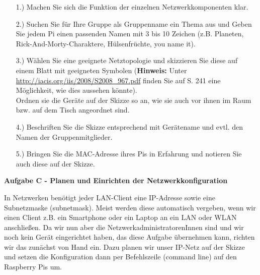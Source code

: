 \documentclass[paper=a4,fontsize=11pt]{scrartcl}%
\numberwithin{equation}{section}
\begin{document}
\begin{itemize}
	\item[1.)] Machen Sie sich die Funktion der einzelnen Netzwerkkomponenten klar.
	\item[2.)] Suchen Sie für Ihre Gruppe als Gruppenname ein Thema aus und Geben Sie jedem Pi einen passenden Namen mit 3 bis 10 Zeichen (z.B. Planeten, Rick-And-Morty-Charaktere, Hülsenfrüchte, you name it).
	\item[3.)] Wählen Sie eine geeignete Netztopologie und skizzieren Sie diese auf einem Blatt mit geeigneten Symbolen (\textbf{Hinweis:} Unter \url{http://iacis.org/iis/2008/S2008_967.pdf} finden Sie auf S. 241 eine Möglichkeit, wie dies aussehen könnte).\\
	Ordnen sie die Geräte auf der Skizze so an, wie sie auch vor ihnen im Raum bzw. auf dem Tisch angeordnet sind. 
	\item[4.)] Beschriften Sie die Skizze entsprechend mit Gerätename und evtl. den Namen der Gruppenmitglieder.
	\item[5.)] Bringen Sie die MAC-Adresse ihres Pis in Erfahrung und notieren Sie auch diese auf der Skizze.
\end{itemize}
\vskip0.5in

\begin{center}\Large{\textbf{Aufgabe C - Planen und Einrichten der Netzwerkkonfiguration}}\end{center}\vskip0.25in
In Netzwerken benötigt jeder LAN-Client eine IP-Adresse sowie eine Subnetzmaske (subnetmask). Meist werden diese automatisch vergeben, wenn wir einen Client z.B. ein Smartphone oder ein Laptop an ein LAN oder WLAN anschließen. Da wir nun aber die NetzwerkadministratorenInnen sind und wir noch kein Gerät eingerichtet haben, das diese Aufgabe übernehmen kann, richten wir das zunächst von Hand ein. Dazu planen wir unser IP-Netz auf der Skizze und setzen die Konfiguration dann per Befehlszeile (command line) auf den Raspberry Pis um.
\end{document}
